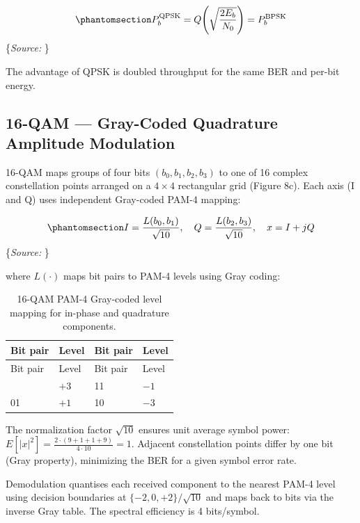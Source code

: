 \documentclass[
  english,
  12pt,
  12pt,
  a4paper,
  oneside]{report}
\begin{document}
\begin{equation}\protect\phantomsection\label{eq:qpsk-ber}{P_b^{\text{QPSK}} = Q\!\left(\sqrt{\frac{2E_b}{N_0}}\right) = P_b^{\text{BPSK}}
}\end{equation} \footnotesize\{\textit{Source: \1}\}\normalsize

The advantage of QPSK is doubled throughput for the same BER and per-bit energy.

\subsection{16-QAM --- Gray-Coded Quadrature Amplitude Modulation}\label{sec:qam-gray-coded-quadrature-amplitude-modulation}

16-QAM maps groups of four bits \((b_0, b_1, b_2, b_3)\) to one of 16 complex constellation points arranged on a \(4 \times 4\) rectangular grid (Figure 8c). Each axis (I and Q) uses independent Gray-coded PAM-4 mapping:

\begin{equation}\protect\phantomsection\label{eq:qam16-mapping}{I = \frac{L(b_0, b_1)}{\sqrt{10}}, \quad Q = \frac{L(b_2, b_3)}{\sqrt{10}}, \quad x = I + jQ
}\end{equation} \footnotesize\{\textit{Source: \1}\}\normalsize

where \(L(\cdot)\) maps bit pairs to PAM-4 levels using Gray coding:

\begin{longtable}[]{@{}llll@{}}
\caption{16-QAM PAM-4 Gray-coded level mapping for in-phase and quadrature components.}\label{tbl:table30}\tabularnewline
\toprule\noalign{}
Bit pair & Level & Bit pair & Level \\
\midrule\noalign{}
\endfirsthead
\toprule\noalign{}
Bit pair & Level & Bit pair & Level \\
\midrule\noalign{}
\endhead
\bottomrule\noalign{}
\endlastfoot
00 & \(+3\) & 11 & \(-1\) \\
01 & \(+1\) & 10 & \(-3\) \\
\end{longtable}

The normalization factor \(\sqrt{10}\) ensures unit average symbol power: \(E[|x|^2] = \frac{2 \cdot (9+1+1+9)}{4 \cdot 10} = 1\). Adjacent constellation points differ by one bit (Gray property), minimizing the BER for a given symbol error rate.

Demodulation quantises each received component to the nearest PAM-4 level using decision boundaries at \(\{-2, 0, +2\}/\sqrt{10}\) and maps back to bits via the inverse Gray table. The spectral efficiency is 4 bits/symbol.
\end{document}
